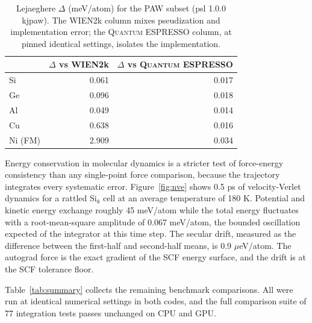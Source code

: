 \documentclass[11pt,twocolumn]{article}
\newcommand{\qe}{\textsc{Quantum ESPRESSO}}
\begin{document}
\begin{table}[t]\centering
\caption{Lejaeghere $\Delta$ (meV/atom) for the PAW subset (psl 1.0.0
kjpaw). The WIEN2k column mixes pseudization and implementation error; the
\qe{} column, at pinned identical settings, isolates the implementation.}
\label{tab:wien2k}
\begin{tabular}{lrr}
\toprule
 & $\Delta$ vs WIEN2k & $\Delta$ vs \qe{} \\
\midrule
Si & 0.061 & 0.017 \\
Ge & 0.096 & 0.018 \\
Al & 0.049 & 0.014 \\
Cu & 0.638 & 0.016 \\
Ni (FM) & 2.909 & 0.034 \\
\bottomrule
\end{tabular}
\end{table}

Energy conservation in molecular dynamics is a stricter test of
force-energy consistency than any single-point force comparison, because
the trajectory integrates every systematic error. Figure~\ref{fig:nve}
shows 0.5 ps of velocity-Verlet dynamics for a rattled Si$_8$ cell at an
average temperature of 180 K. Potential and kinetic energy exchange
roughly 45 meV/atom while the total energy fluctuates with a
root-mean-square amplitude of 0.067 meV/atom, the bounded oscillation
expected of the integrator at this time step. The secular drift, measured
as the difference between the first-half and second-half means, is 0.9
$\mu$eV/atom. The autograd force is the exact gradient of the SCF energy
surface, and the drift is at the SCF tolerance floor.

Table~\ref{tab:summary} collects the remaining benchmark
comparisons. All
were run at identical numerical settings in both codes, and the full
comparison suite of 77 integration tests passes unchanged on CPU and GPU.
\end{document}
